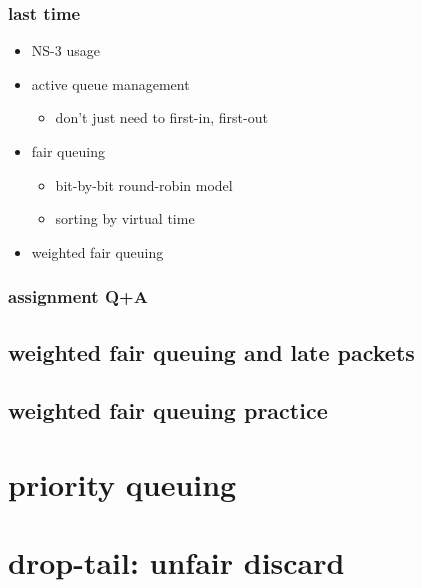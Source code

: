 \date{}
\title{}
\date{}

\begin{frame}
    \titlepage
\end{frame}

\begin{frame}
\frametitle{last time}
\begin{itemize}
\item NS-3 usage
\item active queue management
    \begin{itemize}
    \item don't just need to first-in, first-out
    \end{itemize}
\item fair queuing
    \begin{itemize}
    \item bit-by-bit round-robin model
    \item sorting by virtual time
    \end{itemize}
\item weighted fair queuing
\end{itemize}
\end{frame}

\begin{frame}
\frametitle{}
\end{frame}

\begin{frame}
\frametitle{assignment Q+A}
\end{frame}


\subsection{weighted fair queuing and late packets}


\subsection{weighted fair queuing practice}


\section{priority queuing}


\section{drop-tail: unfair discard}


